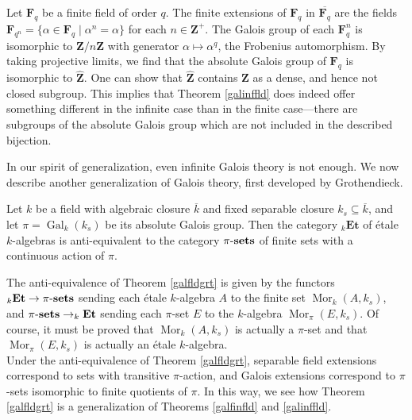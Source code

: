 \documentclass[11pt,openany]{book} %
\newcommand{\Z}{\mathbf{Z}}
\newcommand{\Mor}{\operatorname{Mor}}
\newcommand{\xsets}[1]{#1\textnormal{-}\mathbf{sets}}
\begin{document}
\begin{example}
Let $\mathbf{F}_q$ be a finite field of order $q$. The finite extensions of $\mathbf{F}_q$ in $\overline{\mathbf{F}_q}$ are the fields $\mathbf{F}_{q^n} = \{\alpha \in \mathbf{F}_q \mid \alpha^n = \alpha\}$ for each $n \in \Z^+$. The Galois group of each $\mathbf{F}_q^n$ is isomorphic to $\Z/n\Z$ with generator $\alpha \mapsto \alpha^q$, the Frobenius automorphism. By taking projective limits, we find that the absolute Galois group of $\mathbf{F}_q$ is isomorphic to $\hat{\Z}$. One can show that $\hat{\Z}$ contains $\Z$ as a dense, and hence not closed subgroup. This implies that Theorem \ref{galinffld} does indeed offer something different in the infinite case than in the finite case---there are subgroups of the absolute Galois group which are not included in the described bijection.
\end{example}

In our spirit of generalization, even infinite Galois theory is not enough. We now describe another generalization of Galois theory, first developed by Grothendieck.\\

\begin{theorem} \label{galfldgrt}
Let $k$ be a field with algebraic closure $\overline{k}$ and fixed separable closure $k_s \subseteq \overline{k}$, and let $\pi = \operatorname{Gal}_k(k_s)$ be its absolute Galois group. Then the category $_k\mathbf{Et}$ of \'etale $k$-algebras is anti-equivalent to the category $\xsets{\pi}$ of finite sets with a continuous action of $\pi$.
\end{theorem}

The anti-equivalence of Theorem \ref{galfldgrt} is given by the functors $_k\mathbf{Et} \to \xsets{\pi}$ sending each \'etale $k$-algebra $A$ to the finite set $\Mor_k(A,k_s)$, and $\xsets{\pi} \to _k\mathbf{Et}$ sending each $\pi$-set $E$ to the $k$-algebra $\Mor_{\pi}(E,k_s)$. Of course, it must be proved that $\Mor_k(A,k_s)$ is actually a $\pi$-set and that $\Mor_{\pi}(E,k_s)$ is actually an \'etale $k$-algebra.\\
 
Under the anti-equivalence of Theorem \ref{galfldgrt}, separable field extensions correspond to sets with transitive $\pi$-action, and Galois extensions correspond to $\pi$-sets isomorphic to finite quotients of $\pi$. In this way, we see how Theorem \ref{galfldgrt} is a generalization of Theorems \ref{galfinfld} and \ref{galinffld}.
\end{document}
